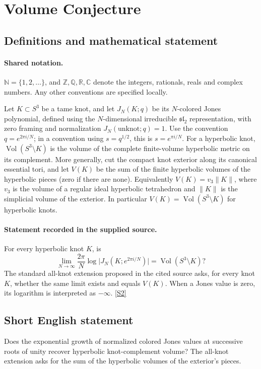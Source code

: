 \documentclass[11pt]{article}
\newcommand{\sref}[2]{\hyperlink{source:#1:#2}{[S#2]}}
\begin{document}
\section{Volume Conjecture}\label{statement}

\subsection{Definitions and mathematical statement}

\paragraph{Shared notation.}$\mathbb N=\{1,2,\ldots\}$, and $\mathbb Z,\mathbb Q,\mathbb R,\mathbb C$ denote the integers, rationals, reals and complex numbers. Any other conventions are specified locally.


Let \(K\subset S^3\) be a tame knot, and let \(J_N(K;q)\)
be its \(N\)-colored Jones polynomial, defined using the
\(N\)-dimensional irreducible \(\mathfrak{sl}_2\) representation,
with zero framing and normalization \(J_N(\text{unknot};q)=1\).
Use the convention \(q=e^{2\pi i/N}\); in a convention using
\(s=q^{1/2}\), this is \(s=e^{\pi i/N}\).
For a hyperbolic knot, \(\operatorname{Vol}(S^3\setminus K)\) is
the volume of the complete finite-volume hyperbolic metric on its
complement. More generally, cut the compact knot exterior along its
canonical essential tori, and let \(V(K)\) be the sum of the
finite hyperbolic volumes of the hyperbolic pieces (zero if there are none).
Equivalently \(V(K)=v_3\|K\|\), where \(v_3\) is the volume of a
regular ideal hyperbolic tetrahedron and \(\|K\|\) is the simplicial
volume of the exterior. In particular \(V(K)=\operatorname{Vol}(S^3\setminus K)\)
for hyperbolic knots.
\paragraph{Statement recorded in the supplied source.}
For every hyperbolic knot \(K\), is
\[
 \lim_{N\to\infty}\frac{2\pi}{N}
      \log\bigl|J_N(K;e^{2\pi i/N})\bigr|
       =\operatorname{Vol}(S^3\setminus K)?
\]
The standard all-knot extension proposed in the cited source asks,
for every knot \(K\), whether the same limit exists and equals \(V(K)\).
When a Jones value is zero, its logarithm is interpreted as \(-\infty\). \sref{statement}{2}
\subsection{Short English statement}
Does the exponential growth of normalized colored Jones values at successive roots of unity recover hyperbolic knot-complement volume? The all-knot extension asks for the sum of the hyperbolic volumes of the exterior's pieces.
\end{document}
